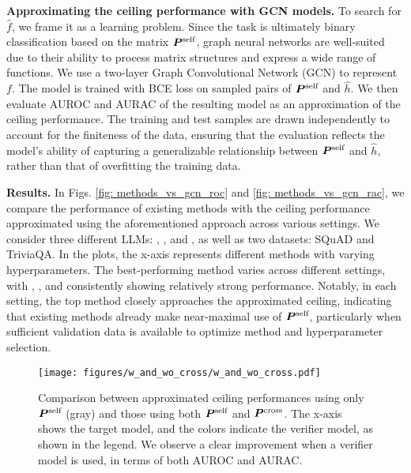\textbf{Approximating the ceiling performance with GCN models.} To search for $\hat{f}$, we frame it as a learning problem. Since the task is ultimately binary classification based on the matrix ${\bm{P}}^{\text{self}}$, graph neural networks are well-suited due to their ability to process matrix structures and express a wide range of functions. We use a two-layer Graph Convolutional Network (GCN) to represent $f$. The model is trained with BCE loss on sampled pairs of ${\bm{P}}^{\text{self}}$ and $\hat{h}$. We then evaluate AUROC and AURAC of the resulting model as an approximation of the ceiling performance. The training and test samples are drawn independently to account for the finiteness of the data, ensuring that the evaluation reflects the model's ability of capturing a generalizable relationship between ${\bm{P}}^{\text{self}}$ and $\hat{h}$, rather than that of overfitting the training data. 

\textbf{Results.} In Figs. \ref{fig: methods_vs_gcn_roc} and \ref{fig: methods_vs_gcn_rac}, we compare the performance of existing methods with the ceiling performance approximated using the aforementioned approach across various settings. We consider three different LLMs: \llamatwothirteen{}, \llamathreeseventy{}, and \mixtral{}, as well as two datasets: SQuAD and TriviaQA. In the plots, the x-axis represents different methods with varying hyperparameters. The best-performing method varies across different settings, with \mpd{}, \kle{}, and \eigv{} consistently showing relatively strong performance. Notably, in each setting, the top method closely approaches the approximated ceiling, indicating that existing methods already make near-maximal use of ${\bm{P}}^{\text{self}}$, particularly when sufficient validation data is available to optimize method and hyperparameter selection.

\begin{figure*}[!t]
    \centering
    \texttt{[image: figures/w\_and\_wo\_cross/w\_and\_wo\_cross.pdf]}
    \vspace{-.2cm}
    \caption{Comparison between approximated ceiling performances using only ${\bm{P}}^{\text{self}}$ (gray) and those using both ${\bm{P}}^{\text{self}}$ and ${\bm{P}}^{\text{cross}}$. The x-axis shows the target model, and the colors indicate the verifier model, as shown in the legend. We observe a clear improvement when a verifier model is used, in terms of both AUROC and AURAC.}
    \label{fig: w_and_wo_cross}
    \vspace{-.3cm}
\end{figure*}

